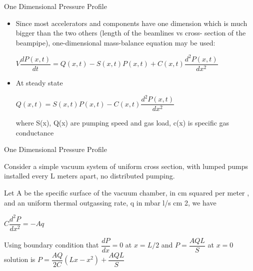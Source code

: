 \documentclass[11]{beamer}
\begin{document}
\begin{frame}{One Dimensional Pressure Profile}
		
	\begin{itemize}
	\item Since most accelerators and components have one dimension which is
much bigger than the two others (length of the beamlines vs cross-
section of the beampipe), one-dimensional mass-balance equation may
be used: \break
			\begin{center}
             $ V\dfrac{dP(x,t)}{dt}=Q(x,t)-S(x,t)P(x,t)+C(x,t)\dfrac{d^{2}P(x,t)}{dx^2}$
			\end{center}
	
	\item At steady state 
	       \begin{center}
             $ Q(x,t)=S(x,t)P(x,t)-C(x,t)\dfrac{d^{2}P(x,t)}{dx^2}$
			\end{center}
	where S(x), Q(x) are pumping speed and gas load, c(x) is specific gas conductance
	
	
	\end{itemize}
	

\end{frame}


\begin{frame}{One Dimensional Pressure Profile}
		
	
	Consider a simple vacuum system of uniform cross section, with lumped pumps installed every L meters apart, no distributed pumping.
	
	 Let A be the specific surface of the vacuum chamber, in cm squared per meter , and an
uniform thermal outgassing rate, q in mbar l/s cm 2, we have
			
             $ C \dfrac{d^{2}P}{dx^2}=-Aq$
			
	
	 Using boundary condition that  $\dfrac{dP}{dx}=0$ at $x=L/2 $ and $P=\dfrac{AQL}{S}$ at $x=0 $ solution is $ P=\dfrac{AQ}{2C}(Lx-x^{2})+\dfrac{AQL}{S}$
	
	
	
	

\end{frame}
\end{document}
